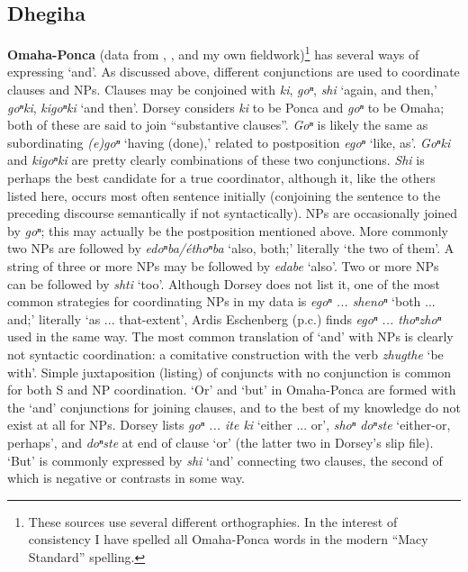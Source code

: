 \documentclass[output=paper]{LSP/langsci}
\begin{document}
\subsection{Dhegiha}
 
\textbf{Omaha-Ponca} (data from \citealt{DorseyND}, \citealt{Koontz1984}, \citealt{Rudin2003} and my own fieldwork)\footnote{These sources use several different orthographies. In the interest of consistency I have spelled all Omaha-Ponca words in the modern ``Macy Standard'' spelling.} has several ways of expressing `and'. As discussed above, different conjunctions are used to coordinate clauses and NPs. Clauses may be conjoined with \textit{ki}, \textit{goⁿ}, \textit{shi} `again, and then,' \textit{goⁿki}, \textit{kigoⁿki} `and then'. Dorsey considers \textit{ki} to be Ponca and \textit{goⁿ} to be Omaha; both of these are said to join ``substantive clauses''. \textit{Goⁿ} is likely the same as subordinating \textit{(e)goⁿ} `having (done),' related to postposition \textit{egoⁿ} `like, as'. \textit{Goⁿki} and \textit{kigoⁿki} are pretty clearly combinations of these two conjunctions. \textit{Shi} is perhaps the best candidate for a true coordinator, although it, like the others listed here, occurs most often sentence initially (conjoining the sentence to the preceding discourse semantically if not syntactically). NPs are occasionally joined by \textit{goⁿ}; this may actually be the postposition mentioned above. More commonly two NPs are followed by \textit{edoⁿba/éthoⁿba} `also, both;' literally `the two of them'. A string of three or more NPs may be followed by \textit{edabe} `also'. Two or more NPs can be followed by \textit{shti} `too'. Although Dorsey does not list it, one of the most common strategies for coordinating NPs in my data is \textit{egoⁿ ... shenoⁿ} `both ... and;' literally `as ... that-extent', Ardis Eschenberg (p.c.) finds \textit{egoⁿ ... thoⁿzhoⁿ} used in the same way. The most common translation of `and' with NPs is clearly not syntactic coordination: a comitative construction with the verb \textit{zhugthe} `be with'. Simple juxtaposition (listing) of conjuncts with no conjunction is common for both S and NP coordination. `Or' and `but' in Omaha-Ponca are formed with the `and' conjunctions for joining clauses, and to the best of my knowledge do not exist at all for NPs. Dorsey lists \textit{goⁿ ... ite ki} `either ... or', \textit{shoⁿ doⁿste} `either-or, perhaps', and \textit{doⁿste} at end of clause `or' (the latter two in Dorsey's slip file). `But' is commonly expressed by \textit{shi} `and' connecting two clauses, the second of which is negative or contrasts in some way.
\end{document}
